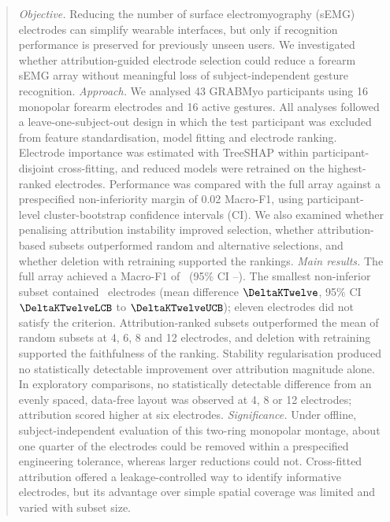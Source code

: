 \documentclass{iopjournal}
\newif\ifshowchanges
\newcommand{\chg}[1]{\ifshowchanges{\color{blue}#1}\else{#1}\fi}
\begin{document}
\begin{abstract}
\justifying
\chg{\textit{Objective.} Reducing the number of surface electromyography (sEMG) electrodes can simplify wearable interfaces, but only if recognition performance is preserved for previously unseen users. We investigated whether attribution-guided electrode selection could reduce a forearm sEMG array without meaningful loss of subject-independent gesture recognition.
\textit{Approach.} We analysed 43 GRABMyo participants using 16 monopolar forearm electrodes and 16 active gestures. All analyses followed a leave-one-subject-out design in which the test participant was excluded from feature standardisation, model fitting and electrode ranking. Electrode importance was estimated with TreeSHAP within participant-disjoint cross-fitting, and reduced models were retrained on the highest-ranked electrodes. Performance was compared with the full array against a prespecified non-inferiority margin of 0.02 Macro-F1, using participant-level cluster-bootstrap confidence intervals (CI). We also examined whether penalising attribution instability improved selection, whether attribution-based subsets outperformed random and alternative selections, and whether deletion with retraining supported the rankings.
\textit{Main results.} The full array achieved a Macro-F1 of \FullXGB\ (95\% CI \FullXGBLCB--\FullXGBUCB). The smallest non-inferior subset contained \KStar\ electrodes (mean difference $\DeltaKTwelve$, 95\% CI $\DeltaKTwelveLCB$ to $\DeltaKTwelveUCB$); eleven electrodes did not satisfy the criterion. Attribution-ranked subsets outperformed the mean of random subsets at 4, 6, 8 and 12 electrodes, and deletion with retraining supported the faithfulness of the ranking. Stability regularisation produced no statistically detectable improvement over attribution magnitude alone. In exploratory comparisons, no statistically detectable difference from an evenly spaced, data-free layout was observed at 4, 8 or 12 electrodes; attribution scored higher at six electrodes.
\textit{Significance.} Under offline, subject-independent evaluation of this two-ring monopolar montage, about one quarter of the electrodes could be removed within a prespecified engineering tolerance, whereas larger reductions could not. Cross-fitted attribution offered a leakage-controlled way to identify informative electrodes, but its advantage over simple spatial coverage was limited and varied with subset size.}
\end{abstract}






\end{document}
